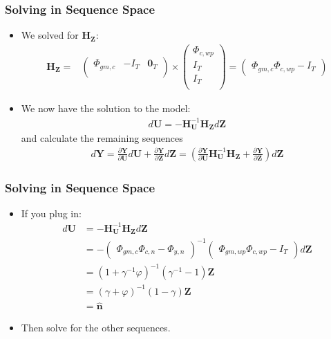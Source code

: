 \documentclass[english,xcolor=svgnames]{beamer}
\begin{document}
	
	\begin{frame}
		\frametitle{Solving in Sequence Space}
			\begin{itemize}
				\item We solved for $\mathbf{H}_{\mathbf{Z}}$:
				\begin{align*}
					\mathbf{H}_{\mathbf{Z}} =&\begin{pmatrix}
						\Phi_{gm,c} & - I_T & \mathbf{0}_T \\ 
					\end{pmatrix}  \times \begin{pmatrix}
						\Phi_{c,wp} \\ 
						I_T  \\
						I_T  \\
					\end{pmatrix} = 
					\begin{pmatrix}
						\Phi_{gm,c}\Phi_{c,wp} - I_T
					\end{pmatrix}
				\end{align*}
				\item We now have the solution to the model:
					\begin{align*}
						d\mathbf{U} = -\mathbf{H}_{\mathbf{U}}^{-1}\mathbf{H}_{\mathbf{Z}}d\mathbf{Z}
					\end{align*}
					and calculate the remaining sequences
					\begin{align*}
						d\mathbf{Y} = \frac{\partial \mathbf{Y}}{\partial \mathbf{U}}d\mathbf{U} +  \frac{\partial \mathbf{Y}}{\partial \mathbf{Z}}d\mathbf{Z} = (\frac{\partial \mathbf{Y}}{\partial \mathbf{U}}\mathbf{H}_{\mathbf{U}}^{-1}\mathbf{H}_{\mathbf{Z}} +  \frac{\partial \mathbf{Y}}{\partial \mathbf{Z}})d\mathbf{Z}
					\end{align*}
			\end{itemize}
	\end{frame}
	
	\begin{frame}
		\frametitle{Solving in Sequence Space}
			\begin{itemize}
				\item If you plug in:
				\begin{align*}
					d\mathbf{U} &= -\mathbf{H}_{\mathbf{U}}^{-1}\mathbf{H}_{\mathbf{Z}}d\mathbf{Z} \\
								&= - \begin{pmatrix}
									\Phi_{gm,c}\Phi_{c,n} - \Phi_{y,n} 
								\end{pmatrix}^{-1}   \begin{pmatrix}
									\Phi_{gm,wp}\Phi_{c,wp} - I_T
								\end{pmatrix}d\mathbf{Z} \\
								&=  (1 + \gamma^{-1}\varphi)^{-1}  (\gamma^{-1} - 1) \mathbf{Z} \\
								&=  (\gamma + \varphi)^{-1}  (1 - \gamma) \mathbf{Z} \\
								&= \mathbf{\hat{n}}
				\end{align*}
				\item Then solve for the other sequences.
			\end{itemize}
	\end{frame}
	
\end{document}

